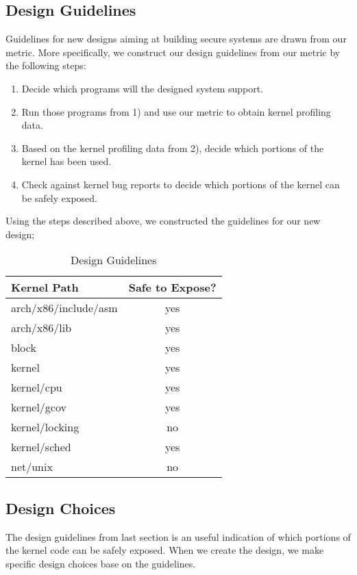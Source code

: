 \subsection{Design Guidelines}
Guidelines for new designs aiming at building secure systems are drawn from our metric. 
More specifically, we construct our design guidelines from our metric by the following steps:

\begin{enumerate}
\item Decide which programs will the designed system support.
\item Run those programs from 1) and use our metric to obtain kernel profiling data.
\item Based on the kernel profiling data from 2), decide which portions of the kernel has been used.
\item Check against kernel bug reports to decide which portions of the kernel can be safely exposed.
\end{enumerate}

Using the steps described above, we constructed the guidelines for our new design; 
 
\begin{table}[ht]
\centering
\begin{tabular}{|l|c|}
  \hline
  Kernel Path & Safe to Expose? \\
  \hline \hline
  arch/x86/include/asm & yes \\
  \hline
  arch/x86/lib & yes \\
  \hline
  block & yes \\
  \hline
  kernel & yes \\
  \hline
  kernel/cpu & yes \\
  \hline
  kernel/gcov & yes \\
  \hline
  kernel/locking & no \\
  \hline
  kernel/sched & yes \\
  \hline
  net/unix & no \\
  \hline
\end{tabular}
\caption {Design Guidelines}
\label{table:design_guidelines}
\end{table}

\subsection{Design Choices}
The design guidelines from last section is an useful indication of which portions of the kernel code can be
safely exposed. When we create the design, we make specific design choices base on the guidelines.

